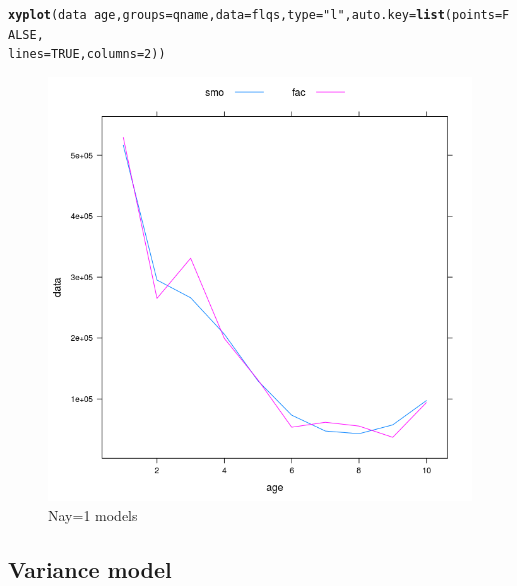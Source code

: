 \documentclass[a4paper,english,10pt]{article}\usepackage[]{graphicx}\usepackage[]{color}
\makeatletter
\def\maxwidth{ %
  \ifdim\Gin@nat@width>\linewidth
    \linewidth
  \else
    \Gin@nat@width
  \fi
}
\newcommand{\hlnum}[1]{\textcolor[rgb]{0.686,0.059,0.569}{#1}}%
\newcommand{\hlstr}[1]{\textcolor[rgb]{0.192,0.494,0.8}{#1}}%
\newcommand{\hlopt}[1]{\textcolor[rgb]{0,0,0}{#1}}%
\newcommand{\hlstd}[1]{\textcolor[rgb]{0.345,0.345,0.345}{#1}}%
\newcommand{\hlkwc}[1]{\textcolor[rgb]{0.333,0.667,0.333}{#1}}%
\newcommand{\hlkwd}[1]{\textcolor[rgb]{0.737,0.353,0.396}{\textbf{#1}}}%
\newenvironment{kframe}{%
 \def\at@end@of@kframe{}%
 \ifinner\ifhmode%
  \def\at@end@of@kframe{\end{minipage}}%
  \begin{minipage}{\columnwidth}%
 \fi\fi%
 \def\FrameCommand##1{\hskip\@totalleftmargin \hskip-\fboxsep
 \colorbox{shadecolor}{##1}\hskip-\fboxsep
     \hskip-\linewidth \hskip-\@totalleftmargin \hskip\columnwidth}%
 \MakeFramed {\advance\hsize-\width
   \@totalleftmargin\z@ \linewidth\hsize
   \@setminipage}}%
 {\par\unskip\endMakeFramed%
 \at@end@of@kframe}
\newenvironment{knitrout}{}{} %
\makeatother
\begin{document}
\begin{knitrout}
\color{fgcolor}\begin{kframe}
\begin{alltt}
\hlkwd{xyplot}\hlstd{(data} \hlopt{~} \hlstd{age,} \hlkwc{groups} \hlstd{= qname,} \hlkwc{data} \hlstd{= flqs,} \hlkwc{type} \hlstd{=} \hlstr{"l"}\hlstd{,} \hlkwc{auto.key} \hlstd{=} \hlkwd{list}\hlstd{(}\hlkwc{points} \hlstd{=} \hlnum{FALSE}\hlstd{,}
    \hlkwc{lines} \hlstd{=} \hlnum{TRUE}\hlstd{,} \hlkwc{columns} \hlstd{=} \hlnum{2}\hlstd{))}
\end{alltt}
\end{kframe}\begin{figure}[H]

{\centering \includegraphics[width=\maxwidth]{figure/ny1-1} 

}

\caption[Nay=1 models]{Nay=1 models}\label{fig:ny1}
\end{figure}


\end{knitrout}

\subsection{Variance model}
\end{document}
